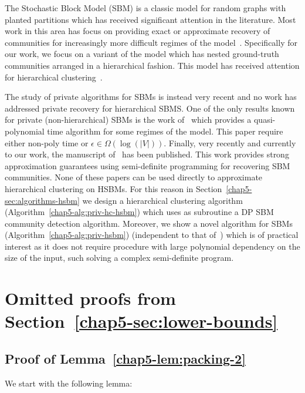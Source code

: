 The Stochastic Block Model (SBM) is a classic model for random graphs with planted partitions which has received  significant attention in the literature. Most work in this area has focus on providing exact or approximate recovery of communities for increasingly more difficult regimes of the model~\citep{MR3520025-Guedon16,montanari2016semidefinite, moitra2016robust,MR4115142,ding2022robust,Liu-Moitra-minimax}. Specifically for our work, we focus on a variant of the model which has nested ground-truth communities arranged in a hierarchical fashion. This model has received attention for hierarchical clustering~\citep{cohen2017hierarchical}.   

The study of private algorithms for SBMs is instead very recent and no work has addressed private recovery for hierarchical SBMS. One of the only results known for private (non-hierarchical) SBMs is the work of~\citet{seif2022differentially} which provides a quasi-polynomial time algorithm for some regimes of the model. This paper require either non-poly time or $\epsilon \in \Omega(\log(|V|))$. 
Finally, very recently and currently to our work, the manuscript of~\citet{chen2023private} has been published. This work provides strong approximation guarantees using semi-definite programming for recovering SBM communities.    
None of these papers can be used directly to approximate hierarchical clustering on HSBMs. For this reason in Section~\ref{chap5-sec:algorithms-hsbm} we design a hierarchical clustering algorithm (Algorithm~\ref{chap5-alg:priv-hc-hsbm}) which uses as subroutine a DP SBM community detection algorithm. Moreover, we show a novel algorithm for SBMs (Algorithm~\ref{chap5-alg:priv-hsbm}) (independent to that of~\citet{chen2023private}) which is of practical interest as it does not require procedure with large polynomial dependency on the size of the input, such  solving a complex semi-definite program.

\section{Omitted proofs from Section~\ref{chap5-sec:lower-bounds}}\label{chap5-app:lower-bounds}
\subsection{Proof of Lemma~\ref{chap5-lem:packing-2}}

We start with the following lemma:


